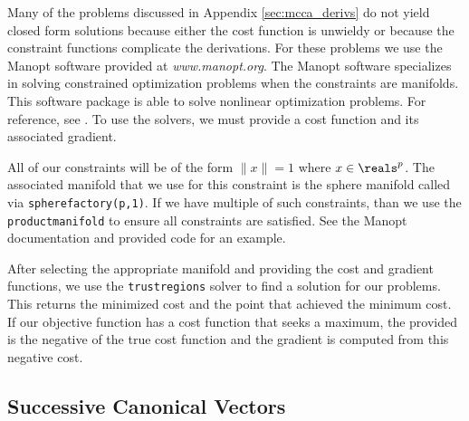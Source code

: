 Many of the problems discussed in Appendix \ref{sec:mcca_derivs} do not yield closed form
solutions because either the cost function is unwieldy or because the constraint functions
complicate the derivations. For these problems we use the Manopt software provided at
\textit{www.manopt.org}. The Manopt software specializes in solving constrained optimization
problems when the constraints are manifolds. This software package is able to solve
nonlinear optimization problems. For reference, see \cite{boumal2013manopt}. To use the
solvers, we must provide a cost function and its associated gradient.

All of our constraints will be of the form $\|x\|=1$ where $x\in\reals^{p}$. The
associated manifold that we use for this constraint is the sphere manifold called via
\texttt{spherefactory(p,1)}. If we have multiple of such constraints, than we use the
\texttt{productmanifold} to ensure all constraints are satisfied. See the Manopt
documentation and provided code for an example. 

After selecting the appropriate manifold and providing the cost and gradient functions, we
use the \texttt{trustregions} solver to find a solution for our problems. This returns the
minimized cost and the point that achieved the minimum cost. If our objective
function has a cost function that seeks a maximum, the provided is the negative of the
true cost function and the gradient is computed from this negative cost. 

\subsection{Successive Canonical Vectors}

